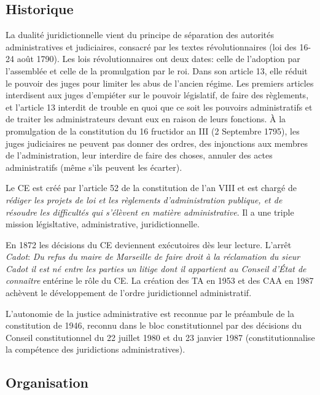 \documentclass[math]{cours}
\begin{document}
\subsection{Historique}
La dualité juridictionnelle vient du principe de séparation des autorités administratives et judiciaires, consacré par les textes révolutionnaires (loi des 16-24 août 1790).
Les lois révolutionnaires ont deux dates: celle de l'adoption par l'assemblée et celle de la promulgation par le roi.
Dans son article 13, elle réduit le pouvoir des juges pour limiter les abus de l'ancien régime.
Les premiers articles interdisent aux juges d'empiéter sur le pouvoir législatif, de faire des règlements, et l'article 13 interdit de trouble en quoi que ce soit les pouvoirs administratifs et de traiter les administrateurs devant eux en raison de leurs fonctions.
À la promulgation de la constitution du 16 fructidor an III (2 Septembre 1795), les juges judiciaires ne peuvent pas donner des ordres, des injonctions aux membres de l'administration, leur interdire de faire des choses, annuler des actes administratifs (même s'ils peuvent les écarter).

Le CE est créé par l'article 52 de la constitution de l'an VIII et est chargé de \emph{rédiger les projets de loi et les règlements d'administration publique, et de résoudre les difficultés qui s'élèvent en matière administrative}.
Il a une triple mission législtative, administrative, juridictionnelle.

En 1872 les décisions du CE deviennent exécutoires dès leur lecture.
L'arrêt \emph{Cadot}: \textit{Du refus du maire de Marseille de faire droit à la réclamation du sieur Cadot il est né entre les parties un litige dont il appartient au Conseil d'État de connaître} entérine le rôle du CE.
La création des TA en 1953 et des CAA en 1987 achèvent le développement de l'ordre juridictionnel administratif.

L'autonomie de la justice administrative est reconnue par le préambule de la constitution de 1946, reconnu dans le bloc constitutionnel par des décisions du Conseil constitutionnel du 22 juillet 1980 et du 23 janvier 1987 (constitutionnalise la compétence des juridictions administratives).

\subsection{Organisation}
\end{document}
